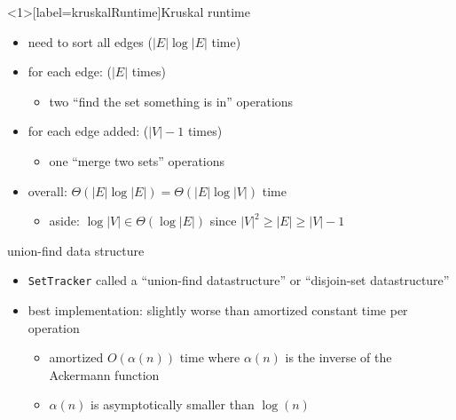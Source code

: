\begin{frame}<1>[label=kruskalRuntime]{Kruskal runtime}
    \begin{itemize}
    \item need to sort all edges ($|E|\log|E|$ time)
    \item for each edge: ($|E|$ times) 
        \begin{itemize}
        \item two ``find the set something is in'' operations
        \end{itemize}
    \item for each edge added: ($|V|-1$ times) 
        \begin{itemize}
        \item one ``merge two sets'' operations
        \end{itemize}
    \vspace{.5cm}
    \item<2> overall: $\Theta(|E|\log|E|) = \Theta(|E|\log|V|)$ time
        \begin{itemize}
            \item aside: $\log|V| \in \Theta(\log|E|)$ since $|V|^2 \ge |E| \ge |V| - 1$
        \end{itemize}
    \end{itemize}
\end{frame}

\begin{frame}{union-find data structure}
    \begin{itemize}
    \item \texttt{SetTracker} called a ``union-find datastructure'' or ``disjoin-set datastructure''
    \item best implementation: slightly worse than amortized constant time per operation
        \begin{itemize}
            \item amortized $O(\alpha(n))$ time where $\alpha(n)$ is the inverse of the Ackermann function
            \item $\alpha(n)$ is asymptotically smaller than $\log(n)$
        \end{itemize}
    \end{itemize}
\end{frame}

